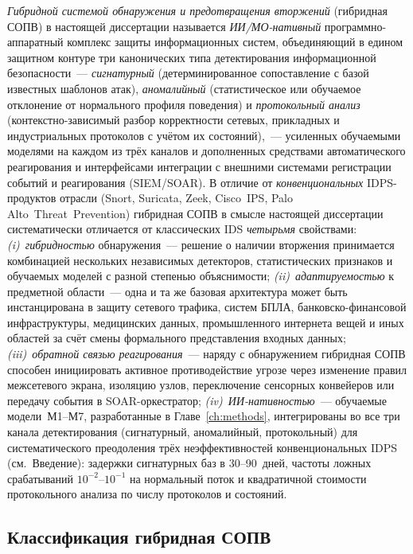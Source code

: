 \emph{Гибридной системой обнаружения и предотвращения вторжений}
(гибридная СОПВ) в настоящей диссертации называется \emph{ИИ/МО-нативный}
программно-аппаратный комплекс защиты информационных систем,
объединяющий в едином защитном контуре три канонических типа
детектирования информационной безопасности~--- \emph{сигнатурный}
(детерминированное сопоставление с базой известных шаблонов атак),
\emph{аномалийный} (статистическое или обучаемое отклонение от
нормального профиля поведения) и \emph{протокольный анализ}
(контекстно-зависимый разбор корректности сетевых, прикладных и
индустриальных протоколов с учётом их состояний),~--- усиленных
обучаемыми моделями на каждом из трёх каналов и дополненных
средствами автоматического реагирования и интерфейсами интеграции с
внешними системами регистрации событий и реагирования (SIEM/SOAR). В отличие от \emph{конвенциональных} IDPS-продуктов отрасли (Snort,
Suricata, Zeek, Cisco~IPS, Palo Alto~Threat~Prevention) гибридная СОПВ
в смысле настоящей диссертации систематически отличается от
классических IDS \emph{четырьмя} свойствами: \emph{(i)}~\emph{гибридностью} обнаружения~--- решение о
наличии вторжения принимается комбинацией нескольких независимых
детекторов, статистических признаков и обучаемых моделей с разной
степенью объяснимости; \emph{(ii)}~\emph{адаптируемостью} к
предметной области~--- одна и та же базовая архитектура может быть
инстанцирована в защиту сетевого трафика, систем БПЛА,
банковско-финансовой инфраструктуры, медицинских данных,
промышленного интернета вещей и иных областей за счёт смены
формального представления входных данных; \emph{(iii)}~\emph{обратной
связью реагирования}~--- наряду с обнаружением гибридная СОПВ
способен инициировать активное противодействие угрозе через изменение
правил межсетевого экрана, изоляцию узлов, переключение сенсорных
конвейеров или передачу события в SOAR-оркестратор;
\emph{(iv)}~\emph{ИИ-нативностью}~--- обучаемые модели~М1--М7,
разработанные в Главе~\ref{ch:methods}, интегрированы во все три
канала детектирования (сигнатурный, аномалийный, протокольный) для
систематического преодоления трёх неэффективностей конвенциональных
IDPS (см.~Введение): задержки сигнатурных баз в 30--90~дней,
частоты ложных срабатываний $10^{-2}$--$10^{-1}$ на нормальный
поток и квадратичной стоимости протокольного анализа по числу
протоколов и состояний.

\subsection{Классификация гибридная СОПВ}
\label{subsec:idps_classification}

